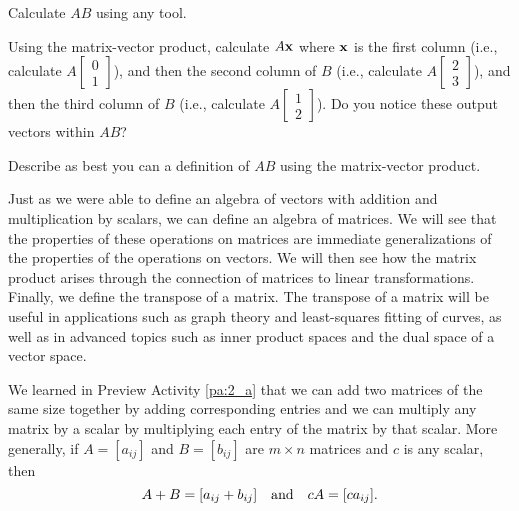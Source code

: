 \begin{pa}
\ba
\item Calculate $AB$ using any tool.

\item Using the matrix-vector product, calculate $A \mathbf{x}$ where $\mathbf{x}$ is the first column (i.e., calculate $A\begin{bmatrix} 0 \\ 1\end{bmatrix}$), and then the second column of $B$ (i.e., calculate $A\begin{bmatrix} 2 \\ 3\end{bmatrix}$), and then the third column of $B$ (i.e., calculate $A\begin{bmatrix} 1 \\ 2\end{bmatrix}$). Do you notice these output vectors within $AB$?

\item Describe as best you can a definition of $AB$ using the matrix-vector product.

\ea
\ee

\end{pa}




Just as we were able to define an algebra of vectors with addition and multiplication by scalars, we can define an algebra of matrices. We will see that the properties of these operations on matrices are immediate generalizations of the properties of the operations on vectors. We will then see how the matrix product arises through the connection of matrices to linear transformations. Finally, we define the transpose of a matrix. The transpose of a matrix will be useful in applications such as graph theory and least-squares fitting of curves, as well as in advanced topics such as inner product spaces and the dual space of a vector space.

We learned in Preview Activity \ref{pa:2_a} that we can add two matrices of the same size together by adding corresponding entries and we can multiply any matrix by a scalar by multiplying each entry of the matrix by that scalar. More generally, if $A = [a_{ij}]$ and $B = [b_{ij}]$ are $m \times n$ matrices and $c$ is any scalar, then  
\[A + B = [a_{ij}+b_{ij}] \ \ \text{ and } \ \ cA = [ca_{ij}].\index{matrix!sum}\]


